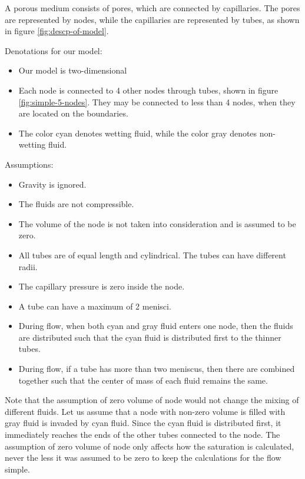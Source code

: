 \documentclass{crm-article}
\begin{document}
		A porous medium consists of pores, which are connected by capillaries. The pores are represented by nodes, while the capillaries are represented by tubes, as shown in figure \ref{fig:descp-of-model}.
		
		Denotations for our model:
		
		\begin{itemize}
			\item Our model is two-dimensional 
			\item Each node is connected to 4 other nodes through tubes, shown in figure \ref{fig:simple-5-nodes}. They may be connected to less than 4 nodes, when they are located on the boundaries.
			\item The color cyan denotes wetting fluid, while the color gray denotes non-wetting fluid.
		\end{itemize}
		
		Assumptions:
		
		\begin{itemize}
			\item Gravity is ignored.
			\item The fluids are not compressible.
			\item The volume of the node is not taken into consideration and is assumed to be zero.
			\item All tubes are of equal length and cylindrical. The tubes can have different radii.
			\item The capillary pressure is zero inside the node.
			\item A tube can have a maximum of 2 menisci.
			\item During flow, when both cyan and gray fluid enters one node, then the fluids are distributed such that the cyan fluid is distributed first to the thinner tubes.
			\item During flow, if a tube has more than two meniscus, then there are combined together such that the center of mass of each fluid remains the same.
		\end{itemize}
		
		Note that the assumption of zero volume of node would not change the mixing of different fluids. Let us assume that a node with non-zero volume is filled with gray fluid is invaded by cyan fluid. Since the cyan fluid is distributed first, it immediately reaches the ends of the other tubes connected to the node. The assumption of zero volume of node only affects how the saturation is calculated, never the less it was assumed to be zero to keep the calculations for the flow simple.
\end{document}

